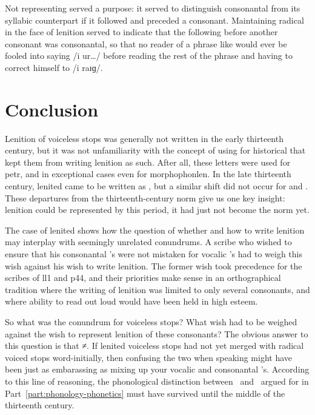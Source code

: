 Not representing  served a purpose: it served to distinguish consonantal  from its syllabic counterpart if it followed  and preceded a consonant.
Maintaining  radical  in the face of lenition served to indicate that the following \mw{\cw} before another consonant was consonantal, so that no reader of a phrase like  would ever be fooled into saying /i ur\dots/ before reading the rest of the phrase and having to correct himself to /i \cw raɪɡ/.

\section{Conclusion}
\label{sec:conclusion-brut}
Lenition of voiceless stops was generally not written in the early thirteenth century, but it was not unfamiliarity with the concept of using  for historical  that kept them from writing lenition as such.
After all, these letters were used for \gls{petr}, and in exceptional cases even for \gls{morphophonlen}.
In the late thirteenth century, lenited  came to be written as , but a similar shift did not occur for  and .
These  departures from the thirteenth-century norm give us one key insight: lenition could be represented by this period, it had just not become the norm yet.

The case of lenited  shows how the question of whether and how to write lenition may interplay with seemingly unrelated conundrums. 
A scribe who wished to ensure that his consonantal \mw{\cw}'s were not mistaken for vocalic 's had to weigh this wish against his wish to write lenition.
The former wish took precedence for the scribes of \gls{ll1} and \gls{p44}, and their priorities make sense in an orthographical tradition where the writing of lenition was limited to only several consonants, and where ability to read out loud would have been held in high esteem.

So what was the conundrum for voiceless stops?
What wish had to be weighed against the wish to represent lenition of these consonants?
The obvious answer to this question is that \lT≠\xD.
If lenited voiceless stops had not yet merged with radical voiced stops word-initially, then confusing the two when speaking might have been just as embarassing as mixing up your vocalic and consonantal 's. 
According to this line of reasoning, the phonological distinction between \lT\ and \xD\ argued for in Part~\ref{part:phonology-phonetics} must have survived until the middle of the thirteenth century.

